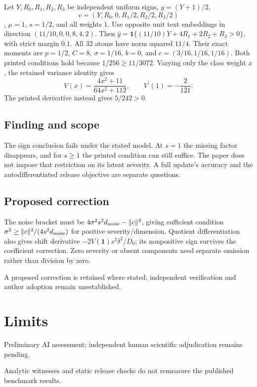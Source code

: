 \documentclass[11pt]{article}
\begin{document}
Let \(Y,R_0,R_1,R_2,R_3\) be independent uniform signs, \(y=(Y+1)/2\), \[v=(Y,R_0,0,R_1/2,R_2/2,R_3/2)\], \(\mu=1\), \(s=1/2\), and all weights \(1\). Use opposite unit text embeddings in direction \((11/10,0,0,8,4,2)\). Then \(\hat y=\mathbf1\{(11/10)Y+4R_1+2R_2+R_3>0\}\), with strict margin \(0.1\). All \(32\) atoms have norm squared \(11/4\). Their exact moments are \(p=1/2\), \(C=8\), \(\sigma=1/16\), \(b=0\), and \(c=(3/16,1/16,1/16)\). Both printed conditions hold because \(1/256\ge11/3072\). Varying only the class weight \(x\), the retained variance identity gives \[V(x)=\frac{4x^2+11}{64x^2+112},\qquad V^{\prime}(1)=-\frac2{121}.\] The printed derivative instead gives \(5/242>0\).

\subsection*{Finding and scope}

The sign conclusion fails under the stated model. At \(s=1\) the missing factor disappears, and for \(s\ge1\) the printed condition can still suffice. The paper does not impose that restriction on its latent severity. A full update’s accuracy and the autodifferentiated release objective are separate questions.

\subsection*{Proposed correction}

The noise bracket must be \(4\sigma^2s^2d_{\rm noise}-\|c\|^2\), giving sufficient condition \(\sigma^2\ge\|c\|^2/(4s^2d_{\rm noise})\) for positive severity/dimension. Quotient differentiation also gives shift derivative \(-2V(\mathbf1)s^2\delta^2/D_0\); its nonpositive sign survives the coefficient correction. Zero severity or absent components need separate omission rather than division by zero.

A proposed correction is retained where stated; independent verification and author adoption remain unestablished.

\section*{Limits}

Preliminary AI assessment; independent human scientific adjudication remains pending.\par

Analytic witnesses and static release checks do not remeasure the published benchmark results.\par
\end{document}
